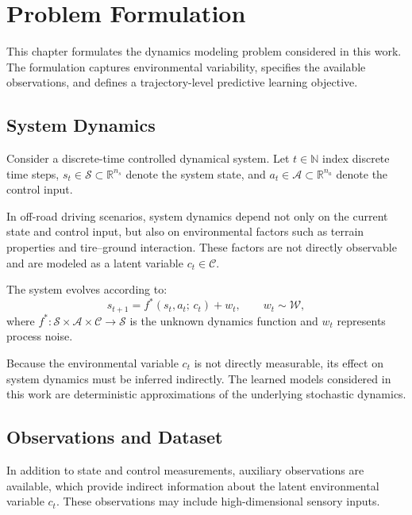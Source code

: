 \chapter{Problem Formulation}
\label{sec:problem}

This chapter formulates the dynamics modeling problem considered in this work. The formulation captures environmental variability, specifies the available observations, and defines a trajectory-level predictive learning objective.

\section{System Dynamics}

Consider a discrete-time controlled dynamical system. Let $t \in \mathbb{N}$ index discrete time steps, $s_t \in \mathcal{S} \subset \mathbb{R}^{n_s}$ denote the system state, and $a_t \in \mathcal{A} \subset \mathbb{R}^{n_a}$ denote the control input.

In off-road driving scenarios, system dynamics depend not only on the current state and control input, but also on environmental factors such as terrain properties and tire--ground interaction. These factors are not directly observable and are modeled as a latent variable $c_t \in \mathcal{C}$.

The system evolves according to:
\begin{equation}
  s_{t+1} = f^*(s_t, a_t;\, c_t) + w_t, \qquad w_t \sim \mathcal{W},
  \label{eq:true-dynamics}
\end{equation}
where $f^*: \mathcal{S} \times \mathcal{A} \times \mathcal{C} \to \mathcal{S}$ is the unknown dynamics function and $w_t$ represents process noise.

Because the environmental variable $c_t$ is not directly measurable, its effect on system dynamics must be inferred indirectly. The learned models considered in this work are deterministic approximations of the underlying stochastic dynamics.

\section{Observations and Dataset}

In addition to state and control measurements, auxiliary observations are available, which provide indirect information about the latent environmental variable $c_t$. These observations may include high-dimensional sensory inputs.

